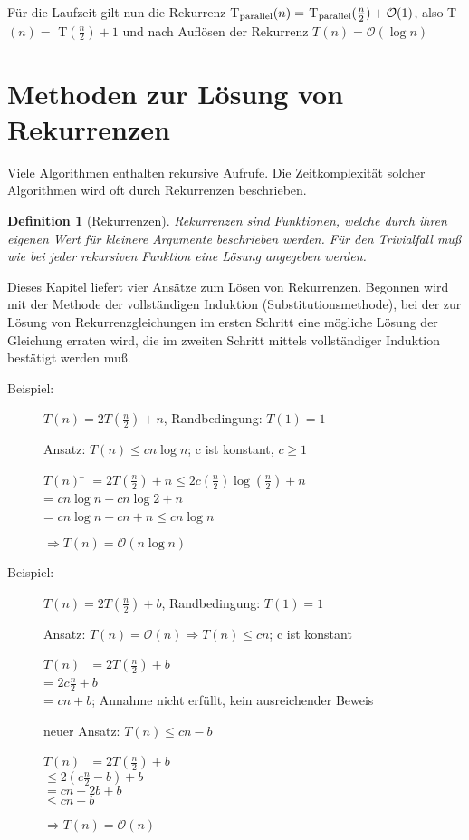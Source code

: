 \documentclass[ngerman,draft,parskip=half*,twoside]{scrreprt}
\theoremstyle{break}
\newtheorem{definition}{Definition}[chapter]
\theoremstyle{nonumberbreak}
\newcommand*{\OO}{\mathcal{O}}      %
\begin{document}
$  $

Für die Laufzeit gilt nun die Rekurrenz T$_{\textup{parallel}}(n) =$ T$_{\textup{parallel}}(\frac{n}{2}) + \OO(1)$,
also T$(n)=$ T$(\frac{n}{2})+1$ und nach Auflösen der Rekurrenz $T(n) = \OO(\log n)$

\section{Methoden zur Lösung von Rekurrenzen}
Viele Algorithmen enthalten rekursive Aufrufe. Die Zeitkomplexität solcher Algorithmen wird oft durch Rekurrenzen beschrieben.
\begin{definition}[Rekurrenzen]
Rekurrenzen sind Funktionen, welche durch ihren eigenen Wert für kleinere Argumente beschrieben werden. Für den Trivialfall muß wie
bei jeder rekursiven Funktion eine Lösung angegeben werden.
\end{definition}
Dieses Kapitel liefert vier Ansätze zum Lösen von Rekurrenzen.
%
%
Begonnen wird mit der Methode der vollständigen Induktion (Substitutionsmethode),
bei der zur Lösung von Rekurrenzgleichungen im ersten Schritt eine mögliche Lösung der Gleichung erraten wird,
die im zweiten Schritt mittels vollständiger Induktion bestätigt werden muß.		

	\begin{description}
		\item [Beispiel:] $T(n) = 2 T\left(\frac{n}{2}\right) + n$, Randbedingung: $T(1)=1$

		Ansatz: $T(n) \leq c n \log n$; c ist konstant, $c \geq 1$
		\begin{tabbing}
			$T(n)$ \= $= 2 T\left(\frac{n}{2}\right)+n\leq 2 c \left(\frac{n}{2}\right) \log\left(\frac{n}{2}\right)+n$\\
			\> = $c n \log n-c n \log 2+n$\\
			\> = $c n \log n-c n+n \leq c n \log n$\\
		\end{tabbing}
		$\Rightarrow T(n)=\OO(n \log n)$
	\end{description}

	\begin{description}
		\item [Beispiel:] $T(n) = 2 T\left(\frac{n}{2}\right) + b$, Randbedingung: $T(1)=1$

		Ansatz: $T(n)=\OO(n)\Rightarrow T(n)\leq c n$; c ist konstant
		\begin{tabbing}
			$T(n)$ \= $= 2 T(\frac{n}{2})+b$\\
			\> = $2c \frac{n}{2} +b$\\
			\> = $c n+b$; Annahme nicht erfüllt, kein ausreichender Beweis
		\end{tabbing}
		neuer Ansatz: $T(n)\leq c n-b$
		\begin{tabbing}
			$T(n)$ \= $=2 T\left(\frac{n}{2} \right)+b$\\
			\> $\leq 2\left(c \frac{n}{2}-b\right)+b$\\
			\> $=c n-2 b+b$\\
			\> $\leq c n-b$
		\end{tabbing}
		$\Rightarrow T(n)=\OO(n)$
	\end{description}
			
\end{document}
